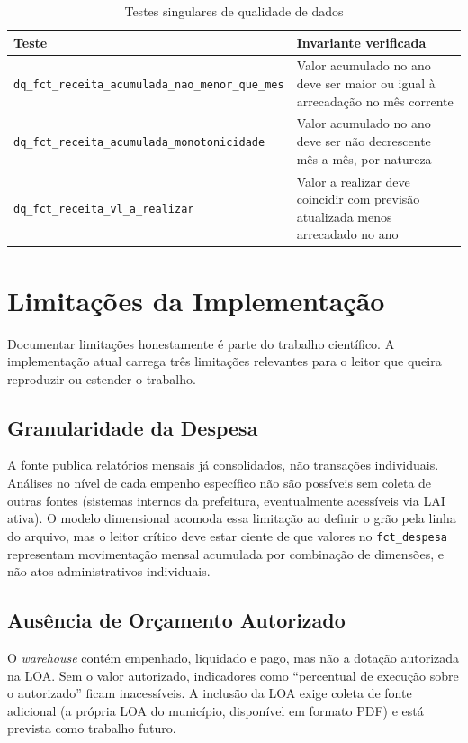 \begin{table}[htb]
\caption{Testes singulares de qualidade de dados}
\label{tab:dq}
\centering
\small
\begin{tabular}{p{6.5cm} p{6.5cm}}
\hline
\textbf{Teste} & \textbf{Invariante verificada} \\
\hline
\texttt{dq\_fct\_receita\_acumulada\_nao\_menor\_que\_mes} & Valor acumulado no ano deve ser maior ou igual à arrecadação no mês corrente \\
\texttt{dq\_fct\_receita\_acumulada\_monotonicidade} & Valor acumulado no ano deve ser não decrescente mês a mês, por natureza \\
\texttt{dq\_fct\_receita\_vl\_a\_realizar} & Valor a realizar deve coincidir com previsão atualizada menos arrecadado no ano \\
\hline
\end{tabular}
\end{table}

\section{Limitações da Implementação}

Documentar limitações honestamente é parte do trabalho científico. A implementação atual carrega três limitações relevantes para o leitor que queira reproduzir ou estender o trabalho.

\subsection{Granularidade da Despesa}

A fonte publica relatórios mensais já consolidados, não transações individuais. Análises no nível de cada empenho específico não são possíveis sem coleta de outras fontes (sistemas internos da prefeitura, eventualmente acessíveis via LAI ativa). O modelo dimensional acomoda essa limitação ao definir o grão pela linha do arquivo, mas o leitor crítico deve estar ciente de que valores no \texttt{fct\_despesa} representam movimentação mensal acumulada por combinação de dimensões, e não atos administrativos individuais.

\subsection{Ausência de Orçamento Autorizado}

O \textit{warehouse} contém empenhado, liquidado e pago, mas não a dotação autorizada na LOA. Sem o valor autorizado, indicadores como ``percentual de execução sobre o autorizado'' ficam inacessíveis. A inclusão da LOA exige coleta de fonte adicional (a própria LOA do município, disponível em formato PDF) e está prevista como trabalho futuro.

